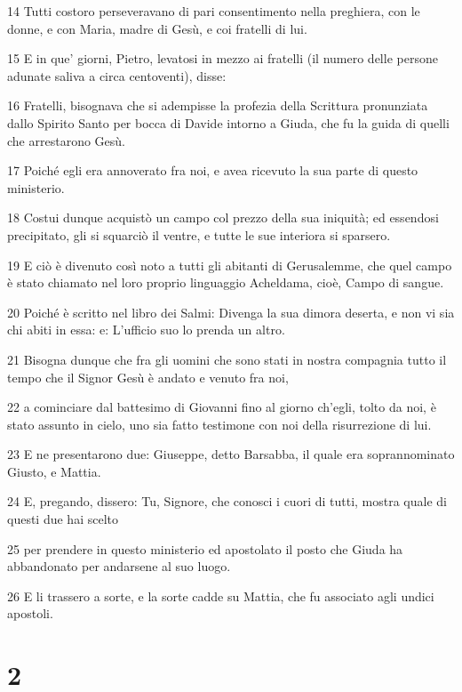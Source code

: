\par 14 Tutti costoro perseveravano di pari consentimento nella preghiera, con le donne, e con Maria, madre di Gesù, e coi fratelli di lui.
\par 15 E in que' giorni, Pietro, levatosi in mezzo ai fratelli (il numero delle persone adunate saliva a circa centoventi), disse:
\par 16 Fratelli, bisognava che si adempisse la profezia della Scrittura pronunziata dallo Spirito Santo per bocca di Davide intorno a Giuda, che fu la guida di quelli che arrestarono Gesù.
\par 17 Poiché egli era annoverato fra noi, e avea ricevuto la sua parte di questo ministerio.
\par 18 Costui dunque acquistò un campo col prezzo della sua iniquità; ed essendosi precipitato, gli si squarciò il ventre, e tutte le sue interiora si sparsero.
\par 19 E ciò è divenuto così noto a tutti gli abitanti di Gerusalemme, che quel campo è stato chiamato nel loro proprio linguaggio Acheldama, cioè, Campo di sangue.
\par 20 Poiché è scritto nel libro dei Salmi: Divenga la sua dimora deserta, e non vi sia chi abiti in essa: e: L'ufficio suo lo prenda un altro.
\par 21 Bisogna dunque che fra gli uomini che sono stati in nostra compagnia tutto il tempo che il Signor Gesù è andato e venuto fra noi,
\par 22 a cominciare dal battesimo di Giovanni fino al giorno ch'egli, tolto da noi, è stato assunto in cielo, uno sia fatto testimone con noi della risurrezione di lui.
\par 23 E ne presentarono due: Giuseppe, detto Barsabba, il quale era soprannominato Giusto, e Mattia.
\par 24 E, pregando, dissero: Tu, Signore, che conosci i cuori di tutti, mostra quale di questi due hai scelto
\par 25 per prendere in questo ministerio ed apostolato il posto che Giuda ha abbandonato per andarsene al suo luogo.
\par 26 E li trassero a sorte, e la sorte cadde su Mattia, che fu associato agli undici apostoli.

\chapter{2}

